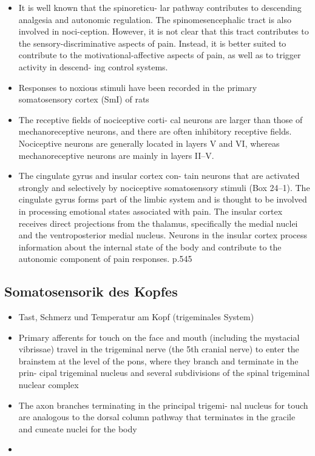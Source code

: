 \documentclass[12pt,a4paper,pdftex]{article}
\begin{document}
\begin{itemize}
\begin{itemize}
        \item It is well known that the spinoreticu-
        lar pathway contributes to descending analgesia and
        autonomic regulation. The spinomesencephalic tract is also involved in noci-ception. However, it is not clear that this tract contributes
        to the sensory-discriminative aspects of pain. Instead, it
        is better suited to contribute to the motivational-affective
        aspects of pain, as well as to trigger activity in descend-
        ing control systems. \cite{paxinos2014rat}
        \item Responses to noxious stimuli have been recorded
        in the primary somatosensory cortex (SmI) of rats
        \cite{paxinos2014rat}
        \item The receptive fields of nociceptive corti-
        cal neurons are larger than those of mechanoreceptive
        neurons, and there are often inhibitory receptive fields.
        Nociceptive neurons are generally located in layers V and VI, whereas mechanoreceptive neurons are mainly
        in layers II–V. \cite{paxinos2014rat}
        \item The cingulate gyrus and insular cortex con-
        tain neurons that are activated strongly and selectively
        by nociceptive somatosensory stimuli (Box 24–1). The
        cingulate gyrus forms part of the limbic system and is
        thought to be involved in processing emotional states
        associated with pain. The insular cortex receives direct
        projections from the thalamus, specifically the medial nuclei and the ventroposterior medial nucleus. Neurons
        in the insular cortex process information about the
        internal state of the body and contribute to the autonomic component of pain responses. \cite{kandel2013principles} p.545
        
    \end{itemize}
\end{itemize}

\subsection{Somatosensorik des Kopfes}
\begin{itemize}
    \item Tast, Schmerz und Temperatur am Kopf (trigeminales System)
    \item Primary
afferents for touch on the face and mouth (including the
mystacial vibrissae) travel in the trigeminal nerve (the 5th cranial nerve) to enter the brainstem at the level of
the pons, where they branch and terminate in the prin-
cipal trigeminal nucleus and several subdivisions of the
spinal trigeminal nuclear complex \cite{paxinos2014rat}
\item The axon branches terminating in the principal trigemi-
nal nucleus for touch are analogous to the dorsal column
pathway that terminates in the gracile and cuneate nuclei
for the body \cite{paxinos2014rat}
\item
\end{itemize}
\end{document}
